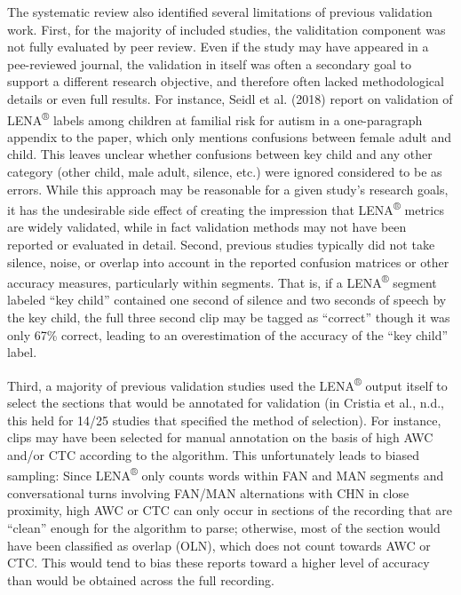 \documentclass[english,table,man,floatsintext]{apa6}
\begin{document}
The systematic review also identified several limitations of previous validation work. First, for the majority of included studies, the validitation component was not fully evaluated by peer review. Even if the study may have appeared in a pee-reviewed journal, the validation in itself was often a secondary goal to support a different research objective, and therefore often lacked methodological details or even full results. For instance, Seidl et al. (2018) report on validation of LENA\textsuperscript{®} labels among children at familial risk for autism in a one-paragraph appendix to the paper, which only mentions confusions between female adult and child. This leaves unclear whether confusions between key child and any other category (other child, male adult, silence, etc.) were ignored considered to be as errors. While this approach may be reasonable for a given study's research goals, it has the undesirable side effect of creating the impression that LENA\textsuperscript{®} metrics are widely validated, while in fact validation methods may not have been reported or evaluated in detail.
Second, previous studies typically did not take silence, noise, or overlap into account in the reported confusion matrices or other accuracy measures, particularly within segments. That is, if a LENA\textsuperscript{®} segment labeled \enquote{key child} contained one second of silence and two seconds of speech by the key child, the full three second clip may be tagged as \enquote{correct} though it was only 67\% correct, leading to an overestimation of the accuracy of the \enquote{key child} label.

Third, a majority of previous validation studies used the LENA\textsuperscript{®} output itself to select the sections that would be annotated for validation (in Cristia et al., n.d., this held for 14/25 studies that specified the method of selection). For instance, clips may have been selected for manual annotation on the basis of high AWC and/or CTC according to the algorithm. This unfortunately leads to biased sampling: Since LENA\textsuperscript{®} only counts words within FAN and MAN segments and conversational turns involving FAN/MAN alternations with CHN in close proximity, high AWC or CTC can only occur in sections of the recording that are \enquote{clean} enough for the algorithm to parse; otherwise, most of the section would have been classified as overlap (OLN), which does not count towards AWC or CTC. This would tend to bias these reports toward a higher level of accuracy than would be obtained across the full recording.
\end{document}
